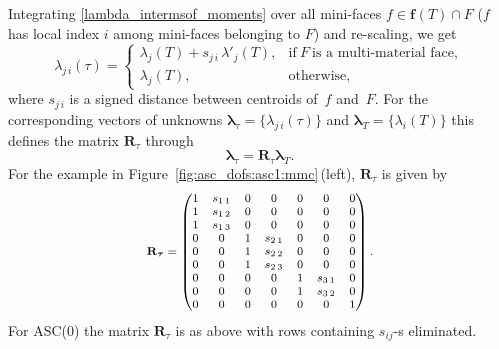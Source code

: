 \documentclass[12pt]{article}
\newcommand{\vect}[1]{\boldsymbol{\mathbf{#1}}}
\newcommand{\bcell}{T}
\newcommand{\mmesh}{{\vect{\mathcal \tau}}}
\newcommand{\bfaces}[1][]{{\vect{\mathcal F}_{\text{#1}}}}
\newcommand{\mfaces}[1][]{{\vect{ f}_{\text{#1}}}}
\begin{document}
Integrating \eqref{lambda_intermsof_moments} over all mini-faces $f\in \mfaces(T)\cap F$ ($f$ has local index $i$ among mini-faces belonging to $F$) and re-scaling, we get
	\begin{equation}\label{asc1_interp}
		\lambda_{j\,i}(\mmesh) =
		\begin{cases}
			\lambda_{j}(\bcell) +  s_{j\,i}\,\lambda'_{j}(\bcell), & \text{if}~F~\text{is a multi-material face}, \\
			\lambda_{j}(\bcell),                                    & \text{otherwise},
		\end{cases}
	\end{equation}
	where $s_{j\,i} $ is a signed distance between centroids of~$f$  and~$F$. For the corresponding vectors of unknowns  ${\vect \lambda}_\mmesh = \{ \lambda_{j\,i}(\mmesh) \}$ and ${\vect \lambda}_\bcell = \{ \lambda_{i}(\bcell) \}$ this defines
the matrix $\vect R_\mmesh$ through
\[
{\vect \lambda}_\mmesh=\vect R_\mmesh {\vect \lambda}_\bcell.
\]
For the example in Figure~\ref{fig:asc_dofs:asc1:mmc}\,(left), $\vect R_\mmesh$ is given by
\begin{equation*}\footnotesize
	\vect R_\mmesh
		=
		 \begin{pmatrix}
			1 &  s_{1\,1} & 0 & 0 & 0 & 0 & 0 \\
			1 &  s_{1\,2} & 0 & 0 & 0 & 0 & 0 \\
			1 &  s_{1\,3} & 0 & 0 & 0 & 0 & 0 \\
			0 & 0 & 1 &  s_{2\,1} & 0 & 0 & 0 \\
			0 & 0 & 1 &  s_{2\,2} & 0 & 0 & 0 \\
			0 & 0 & 1 &  s_{2\,3} & 0 & 0 & 0 \\
			0 & 0 & 0 & 0 & 1 &  s_{3\,1} & 0 \\
			0 & 0 & 0 & 0 & 1 &  s_{3\,2} & 0 \\
			0 & 0 & 0 & 0 & 0 & 0 & 1
		\end{pmatrix}.		
	\end{equation*}
For ASC(0) the matrix $\vect R_\mmesh$  is as above with rows containing $s_{ij}$-s eliminated.
	
\end{document}
